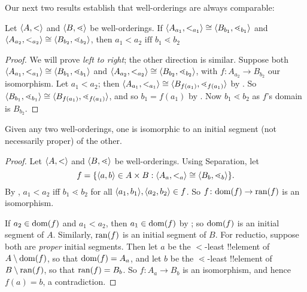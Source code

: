 \documentclass[../../../include/open-logic-section]{subfiles}
\begin{document}
Our next two results establish that well-orderings are always
comparable:

\begin{lem}
Let $\langle A, < \rangle$ and $\langle B, \lessdot \rangle$ be well-orderings. If
$\langle A_{a_1}, <_{a_1} \rangle \cong \langle B_{b_1}, \lessdot_{b_1} \rangle$
and $\langle A_{{a_2}}, <_{a_2} \rangle \cong \langle B_{{b_2}},
\lessdot_{b_2} \rangle$, then ${a_1}  < {a_2} \text{ iff }{b_1} \lessdot
{b_2}$
\end{lem}

\begin{proof}
We will prove \emph{left to right}; the other direction is similar.
Suppose both $\langle A_{a_1}, <_{a_1} \rangle \cong \langle B_{b_1},
\lessdot_{b_1} \rangle$ and $\langle A_{{a_2}},
<_{a_2} \rangle \cong \langle B_{{b_2}}, \lessdot_{b_2} \rangle$, with $f \colon
A_{{a_2}} \to B_{{b_2}}$ our isomorphism. Let ${a_1} < {a_2}$; then
$\langle A_{a_1}, <_{a_1} \rangle \cong \langle B_{f({a_1})},
\lessdot_{f({a_1})} \rangle$ by . So
$\langle B_{b_1}, \lessdot_{b_1} \rangle \cong \langle B_{f({a_1})},
\lessdot_{f({a_1})} \rangle$, and so ${b_1} = f({a_1})$ by
. Now ${b_1} \lessdot {b_2}$ as $f$'s domain
is $B_{{b_2}}$.	
\end{proof}

\begin{thm}
Given any two well-orderings, one is isomorphic to an initial segment
(not necessarily proper) of the other.
\end{thm}

\begin{proof}
Let $\langle A, < \rangle$ and $\langle B, \lessdot \rangle$ be well-orderings. Using
Separation, let
\[
	f = \{ \langle a, b \rangle \in A \times B : 
		\langle A_a, <_a \rangle \cong \langle B_b, \lessdot_b \rangle \}.
\]
By , $a_1 < a_2$ iff $b_1 \lessdot b_2$ for all
$\langle a_1, b_1 \rangle, \langle a_2, b_2 \rangle \in f$. So $f \colon \mathrm{dom}(f) \to
\mathrm{ran}(f)$ is an isomorphism. 

If $a_2 \in \mathrm{dom}(f)$ and $a_1 < a_2$, then $a_1 \in \mathrm{dom}(f)$ by
; so $\mathrm{dom}(f)$ is an initial segment of
$A$. Similarly, $\mathrm{ran}(f)$ is an initial segment of $B$. For reductio,
suppose both are \emph{proper} initial segments. Then let $a$ be the
$<$-least !!{element} of $A \setminus \mathrm{dom}(f)$, so that $\mathrm{dom}(f) =
A_a$, and let $b$ be the $\lessdot$-least !!{element} of $B \setminus
\mathrm{ran}(f)$, so that $\mathrm{ran}(f) = B_b$. So $f \colon A_a \to B_b$ is an
isomorphism, and hence $f(a) = b$, a contradiction.
\end{proof}
\end{document}
